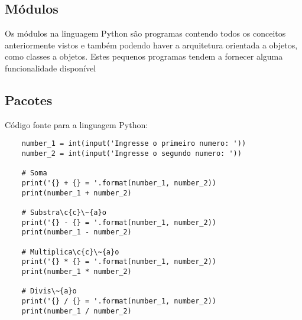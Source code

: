             \subsection{M\'{o}dulos}
Os módulos na linguagem Python são programas contendo todos os conceitos anteriormente vistos e também podendo haver a arquitetura orientada a objetos, como classes a objetos. Estes pequenos programas tendem a fornecer alguma funcionalidade disponível  


            \subsection{Pacotes}






    C\'{o}digo fonte para a linguagem Python:
    \begin{lstlisting}
    number_1 = int(input('Ingresse o primeiro numero: '))
    number_2 = int(input('Ingresse o segundo numero: '))

    # Soma
    print('{} + {} = '.format(number_1, number_2))
    print(number_1 + number_2)

    # Substra\c{c}\~{a}o
    print('{} - {} = '.format(number_1, number_2))
    print(number_1 - number_2)

    # Multiplica\c{c}\~{a}o
    print('{} * {} = '.format(number_1, number_2))
    print(number_1 * number_2)

    # Divis\~{a}o
    print('{} / {} = '.format(number_1, number_2))
    print(number_1 / number_2)
    \end{lstlisting}





